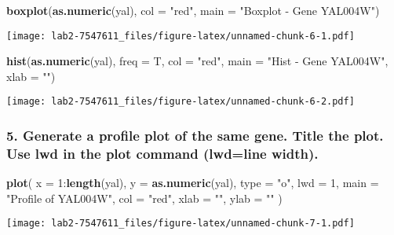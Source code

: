 \documentclass[]{article}
\newenvironment{Shaded}{\begin{snugshade}}{\end{snugshade}}
\newcommand{\KeywordTok}[1]{\textcolor[rgb]{0.13,0.29,0.53}{\textbf{{#1}}}}
\newcommand{\DataTypeTok}[1]{\textcolor[rgb]{0.13,0.29,0.53}{{#1}}}
\newcommand{\DecValTok}[1]{\textcolor[rgb]{0.00,0.00,0.81}{{#1}}}
\newcommand{\StringTok}[1]{\textcolor[rgb]{0.31,0.60,0.02}{{#1}}}
\newcommand{\NormalTok}[1]{{#1}}
\begin{document}
\begin{Shaded}
\begin{Highlighting}[]
\KeywordTok{boxplot}\NormalTok{(}\KeywordTok{as.numeric}\NormalTok{(yal), }\DataTypeTok{col =} \StringTok{"red"}\NormalTok{, }\DataTypeTok{main =} \StringTok{"Boxplot - Gene YAL004W"}\NormalTok{)}
\end{Highlighting}
\end{Shaded}

\texttt{[image: lab2-7547611\_files/figure-latex/unnamed-chunk-6-1.pdf]}

\begin{Shaded}
\begin{Highlighting}[]
\KeywordTok{hist}\NormalTok{(}\KeywordTok{as.numeric}\NormalTok{(yal), }\DataTypeTok{freq =} \NormalTok{T, }\DataTypeTok{col =} \StringTok{"red"}\NormalTok{,}
    \DataTypeTok{main =} \StringTok{"Hist - Gene YAL004W"}\NormalTok{, }\DataTypeTok{xlab =} \StringTok{""}\NormalTok{)}
\end{Highlighting}
\end{Shaded}

\texttt{[image: lab2-7547611\_files/figure-latex/unnamed-chunk-6-2.pdf]}
\newpage

\subsubsection{5. Generate a profile plot of the same gene. Title the
plot. Use lwd in the plot command (lwd=line
width).}\label{generate-a-profile-plot-of-the-same-gene.-title-the-plot.-use-lwd-in-the-plot-command-lwdline-width.}

\begin{Shaded}
\begin{Highlighting}[]
\KeywordTok{plot}\NormalTok{(}
    \DataTypeTok{x =} \DecValTok{1}\NormalTok{:}\KeywordTok{length}\NormalTok{(yal),}
    \DataTypeTok{y =} \KeywordTok{as.numeric}\NormalTok{(yal),}
    \DataTypeTok{type =} \StringTok{"o"}\NormalTok{,}
    \DataTypeTok{lwd =} \DecValTok{1}\NormalTok{,}
    \DataTypeTok{main =} \StringTok{"Profile of YAL004W"}\NormalTok{,}
    \DataTypeTok{col =} \StringTok{"red"}\NormalTok{,}
    \DataTypeTok{xlab =} \StringTok{""}\NormalTok{,}
    \DataTypeTok{ylab =} \StringTok{""}
\NormalTok{)}
\end{Highlighting}
\end{Shaded}

\texttt{[image: lab2-7547611\_files/figure-latex/unnamed-chunk-7-1.pdf]}
\end{document}
